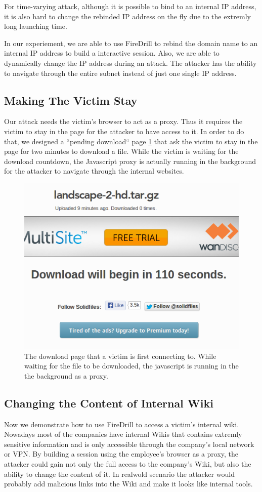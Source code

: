 For time-varying attack, although it is possible to bind to an internal IP address, it is also hard to change the rebinded IP address on the fly due to the extremly long launching time. 

In our experiement, we are able to use FireDrill to rebind the domain name to an internal IP address to build a interactive session. Also, we are able to dynamically change the IP address during an attack. The attacker has the ability to navigate through the entire subnet instead of just one single IP address.

\subsection{Making The Victim Stay}
Our attack needs the victim's browser to act as a proxy. Thus it requires the victim to stay in the page for the attacker to have access to it. In order to do that, we designed a ``pending download`` page \ref{fig:download} that ask the victim to stay in the page for two minutes to download a file. While the victim is waiting for the download countdown, the Javascript proxy is actually running in the background for the attacker to navigate through the internal websites.

\begin{figure}[h]
\centering
\includegraphics[width=0.8\columnwidth]{download.png}
\caption{The download page that a victim is first connecting to. While waiting for the file to be downloaded, the javascript is running in the the background as a proxy.}
\label{fig:download}
\end{figure}

\subsection{Changing the Content of Internal Wiki}
Now we demonstrate how to use FireDrill to access a victim's internal wiki. Nowadays most of the companies have internal Wikis that contains extremly sensitive information and is only accessible through the company's local network or VPN. By building a session using the employee's browser as a proxy, the attacker could gain not only the full access to the company's Wiki, but also the ability to change the content of it. In realwold scenario the attacker would probably add malicious links into the Wiki and make it looks like internal tools.

